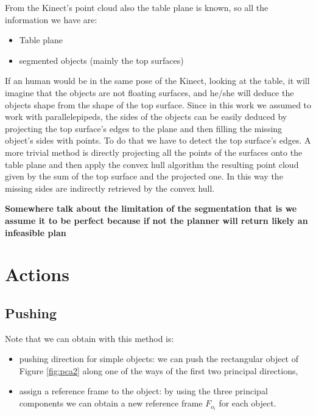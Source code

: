 From the Kinect's point cloud also the table plane is known, so all the information we have are:
\begin{itemize}
\item Table plane
\item segmented objects (mainly the top surfaces)
\end{itemize}
If an human would be in the same pose of the Kinect, looking at the table, it will imagine that the objects are not floating surfaces, and he/she will deduce the objects shape from the shape of the top surface. Since in this work we assumed to work with parallelepipeds, the sides of the objects can be easily deduced by projecting the top surface's edges to the plane and then filling the missing object's sides with points. To do that we have to detect the top surface's edges. A more trivial method is directly projecting all the points of the surfaces onto the table plane and then apply the convex hull algorithm the resulting point cloud given by the sum of the top surface and the projected one. In this way the missing sides are indirectly retrieved by the convex hull. 



\textbf{Somewhere talk about the limitation of the segmentation that is we assume it to be perfect because if not the planner will return likely an infeasible plan}

\section{Actions}

\subsection{Pushing}

Note that we can obtain with this method is:
\begin{itemize}
\item pushing direction for simple objects: we can push the rectangular object of Figure \ref{fig:pca2} along one of the ways of the first two principal directions, 
\item assign a reference frame to the object: by using the three principal components we can obtain a new reference frame $F_{o_i}$ for each object.
\end{itemize}


